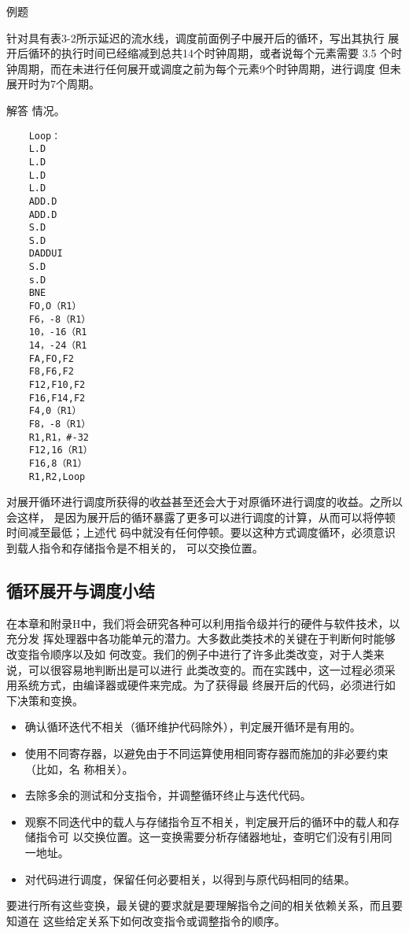 例题

针对具有表3-2所示延迟的流水线，调度前面例子中展开后的循环，写出其执行
展开后循环的执行时间已经缩减到总共14个时钟周期，或者说每个元素需要 3.5
个时钟周期，而在未进行任何展开或调度之前为每个元素9个时钟周期，进行调度
但未展开时为7个周期。

解答
情况。
\begin{verbatim}
    Loop：
    L.D
    L.D
    L.D
    L.D
    ADD.D
    ADD.D
    S.D
    S.D
    DADDUI
    S.D
    s.D
    BNE
    FO,O（R1）
    F6，-8（R1）
    10，-16（R1
    14，-24（R1
    FA,FO,F2
    F8,F6,F2
    F12,F10,F2
    F16,F14,F2
    F4,0（R1）
    F8，-8（R1）
    R1,R1，#-32
    F12,16（R1）
    F16,8（R1）
    R1,R2,Loop
\end{verbatim}
对展开循环进行调度所获得的收益甚至还会大于对原循环进行调度的收益。之所以会这样，
是因为展开后的循环暴露了更多可以进行调度的计算，从而可以将停顿时间减至最低；上述代
码中就没有任何停顿。要以这种方式调度循环，必须意识到载人指令和存储指令是不相关的，
可以交換位置。
\subsection{循环展开与调度小结}
在本章和附录H中，我们将会研究各种可以利用指令级并行的硬件与软件技术，以充分发
挥处理器中各功能单元的潜力。大多数此类技术的关键在于判断何时能够改变指令顺序以及如
何改变。我们的例子中进行了许多此类改变，对于人类来说，可以很容易地判断出是可以进行
此类改变的。而在实践中，这一过程必须采用系统方式，由编译器或硬件来完成。为了获得最
终展开后的代码，必须进行如下决策和变换。

\begin{itemize}
    \item 确认循环迭代不相关（循环维护代码除外），判定展开循环是有用的。
    \item 使用不同寄存器，以避免由于不同运算使用相同寄存器而施加的非必要约束（比如，名
    称相关）。
    \item 去除多余的测试和分支指令，并调整循环终止与迭代代码。
    \item 观察不同迭代中的载人与存储指令互不相关，判定展开后的循环中的载人和存储指令可
    以交换位置。这一变换需要分析存储器地址，查明它们没有引用同一地址。
    \item 对代码进行调度，保留任何必要相关，以得到与原代码相同的结果。
\end{itemize}

要进行所有这些变换，最关键的要求就是要理解指令之间的相关依赖关系，而且要知道在
这些给定关系下如何改变指令或调整指令的顺序。


